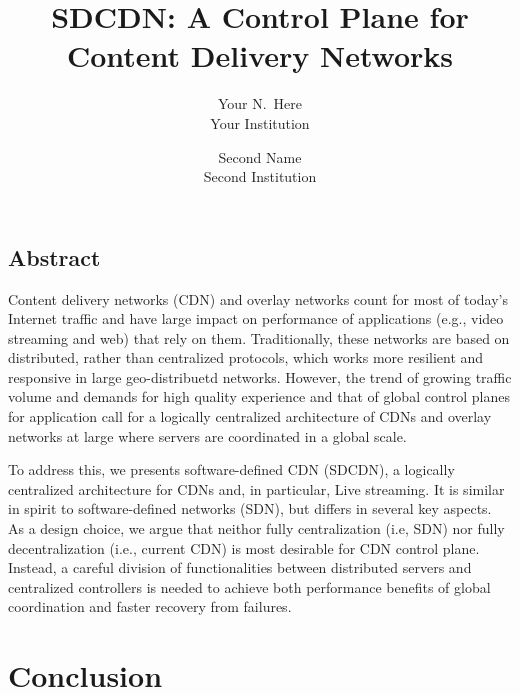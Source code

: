 \documentclass[letterpaper,twocolumn,10pt]{article}
\begin{document}
\date{}

\title{SDCDN: A Control Plane for Content Delivery Networks}

\author{
{\rm Your N.\ Here}\\
Your Institution
\and
{\rm Second Name}\\
Second Institution
} %

\maketitle

\thispagestyle{empty}


\subsection*{Abstract}
Content delivery networks (CDN) and overlay networks count for most of today's Internet traffic and have large impact on performance of applications (e.g., video streaming and web) that rely on them. 
Traditionally, these networks are based on distributed, rather than centralized protocols, which works more resilient and responsive in large geo-distribuetd networks. However, the trend of growing traffic volume and demands for high quality experience and that of global control planes for application call for a logically centralized architecture of CDNs and overlay networks at large where servers are coordinated in a global scale. 

To address this, we presents software-defined CDN (SDCDN), a logically centralized architecture for CDNs and, in particular, Live streaming. It is similar in spirit to software-defined networks (SDN), but differs in several key aspects. As a design choice, we argue that neithor fully centralization (i.e, SDN) nor fully decentralization (i.e., current CDN) is most desirable for CDN control plane. Instead, a careful division of functionalities between distributed servers and centralized controllers is needed to achieve both performance benefits of global coordination and faster recovery from failures. 














\section{Conclusion}

{\footnotesize 
}


\theendnotes
\end{document}
